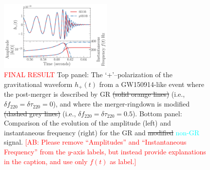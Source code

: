 \documentclass[twocolumn,prd,aps,superscriptaddress,preprintnumbers,tightenlines,showpacs,nofootinbib,eqsecnum,amsfonts,amsmath]{revtex4-1}
\newcommand{\ab}[1]{\textcolor{cyan}{#1}}
\newcommand{\comment}[1]{\textcolor{red}{[#1]}}
\newcommand{\df}[1]{\delta f_{\text{#1}}}
\newcommand{\dtau}[1]{\delta \tau_{\text{#1}}}
\begin{document}
\begin{figure}
	\includegraphics[width=0.5\textwidth]{figures/modGR_waveforms_amplitudephase.png}
	\caption{\textcolor{red}{FINAL RESULT} Top panel: The `+'--polarization of the gravitational waveform $h_+(t)$ from a GW150914-like event where the post-merger is described by GR \sout{(solid orange lines)} (i.e., $\df{220} = \dtau{220} = 0$), and where the merger-ringdown is modified \sout{(dashed grey lines)} (i.e., $\df{220} = \dtau{220} = 0.5$). Bottom panel: Comparison of the evolution of the amplitude (left) and instantaneous frequency (right) for the GR and \sout{modified} \ab{non-GR} signal. \comment{AB: Please remove ``Amplitudes'' and ``Instantaneous Frequency'' from the $y$-axis labels, but instead provide explanations in the caption, and use only $f(t)$ as label.}}
	\label{fig:nongr_waveform}
\end{figure}
\end{document}
